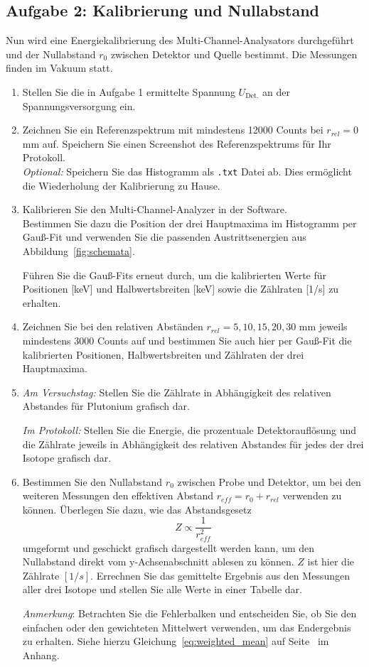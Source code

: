 \subsection{Aufgabe 2: Kalibrierung und Nullabstand}
Nun wird eine Energiekalibrierung des Multi-Channel-Analysators durchgeführt und der Nullabstand $r_0$ zwischen Detektor und Quelle bestimmt. Die Messungen finden im Vakuum statt.

\begin{enumerate}[label=\textbf{\alph*)}]
	\item Stellen Sie die in Aufgabe 1 ermittelte Spannung $U_{\text{Det.}}$ an der Spannungsversorgung ein.
	\item Zeichnen Sie ein Referenzspektrum mit mindestens 12000 Counts bei $r_{rel} = 0$ mm auf. Speichern Sie einen Screenshot des Referenzspektrums für Ihr Protokoll.
		\\ \textit{Optional:} Speichern Sie das Histogramm als \verb|.txt| Datei ab. Dies ermöglicht die Wiederholung der Kalibrierung zu Hause. 
	\item Kalibrieren Sie den Multi-Channel-Analyzer in der Software. \\Bestimmen Sie dazu die Position der drei Hauptmaxima im Histogramm per Gauß-Fit und verwenden Sie die passenden Austrittsenergien aus Abbildung~\ref{fig:schemata}.
	
	Führen Sie die Gauß-Fits erneut durch, um die kalibrierten Werte für Positionen [keV] und Halbwertsbreiten [keV] sowie die Zählraten [1/s] zu erhalten.
	\item Zeichnen Sie bei den relativen Abständen $r_{rel} = 5, 10, 15, 20, 30$ mm jeweils mindestens 3000 Counts auf und bestimmen Sie auch hier per Gauß-Fit die kalibrierten Positionen, Halbwertsbreiten und Zählraten der drei Hauptmaxima.
	\item \textit{Am Versuchstag:} Stellen Sie die Zählrate in Abhängigkeit des relativen Abstandes für Plutonium grafisch dar.
	
	\textit{Im Protokoll:} Stellen Sie die Energie, die prozentuale Detektorauflösung und die Zählrate  jeweils in Abhängigkeit des relativen Abstandes für jedes der drei Isotope grafisch dar.
	\item Bestimmen Sie den Nullabstand $r_0$ zwischen Probe und Detektor, um bei den weiteren Messungen den effektiven Abstand $r_{eff} = r_0 + r_{rel}$ verwenden zu können. Überlegen Sie dazu, wie das Abstandsgesetz
	\begin{equation}
		Z \propto \frac{1}{r^2_{eff}}
	\end{equation}
	umgeformt und geschickt grafisch dargestellt werden kann, um den Nullabstand direkt vom y-Achsenabschnitt ablesen zu können. $Z$ ist hier die Zählrate $[1/s]$. Errechnen Sie das gemittelte Ergebnis aus den Messungen aller drei Isotope und stellen Sie alle Werte in einer Tabelle dar.

    \textit{Anmerkung}: Betrachten Sie die Fehlerbalken und entscheiden Sie, ob Sie den einfachen oder den gewichteten Mittelwert verwenden, um das Endergebnis zu erhalten. Siehe hierzu Gleichung~\eqref{eq:weighted_mean} auf Seite~\pageref{eq:weighted_mean} im Anhang.
	

\end{enumerate}

